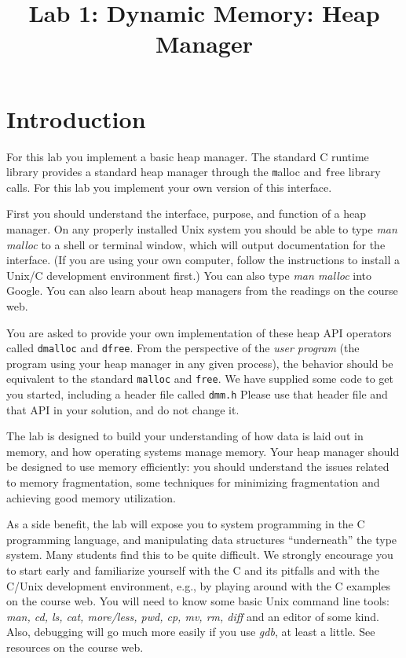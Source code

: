 \documentclass[a4paper,10pt]{article}
\title{Lab 1: Dynamic Memory: Heap Manager}
\date{}
\begin{document}
\maketitle

\section{Introduction}
For this lab you implement a basic heap manager.  
The standard C runtime library provides a standard heap manager
through the {\texttt malloc} and {\texttt free} library calls.  For this lab
you implement your own version of this interface.

First you should understand the interface, purpose, and function of
a heap manager.   On any properly installed Unix system you should be
able to type {\it man malloc} to a shell or terminal window, which
will output documentation for the interface.  (If you
are using your own computer, follow the instructions to install a
Unix/C development environment first.)  You can also type  {\it man malloc}
into Google.   You can also learn about heap managers from the
readings on the course web.

You are asked to provide your own implementation of these heap API
operators called \texttt{dmalloc} and \texttt{dfree}. 
From the
perspective of the {\it user program} (the program using your heap manager in any given process), the behavior should
be equivalent to the standard \texttt{malloc} and \texttt{free}.  We
have supplied some code to get you started, including a header file called \texttt{dmm.h}
Please use that header file and that API
in your solution, and do not change it.


The lab is designed to build your understanding of how data is laid out in
memory, and how operating systems manage memory.
Your heap manager should be designed to use memory efficiently: you should understand the issues related to memory fragmentation, some
techniques for minimizing fragmentation and achieving good memory utilization.

As a side benefit, the lab will expose you to system programming in the C
programming language, and manipulating data structures ``underneath''
the type system.   Many students find this to
be quite difficult.   We strongly encourage you to start early and
familiarize yourself with the C and its pitfalls and with the C/Unix development environment, e.g., by playing
around with the C examples on the course web.  You will need to know some
basic Unix command line tools: {\it man, cd, ls, cat, more/less, pwd,
  cp, mv, rm, diff} and an editor of some kind.  Also, debugging will
go much more easily if you use {\it gdb}, at least a little.  See
resources on the course web.
\end{document}
